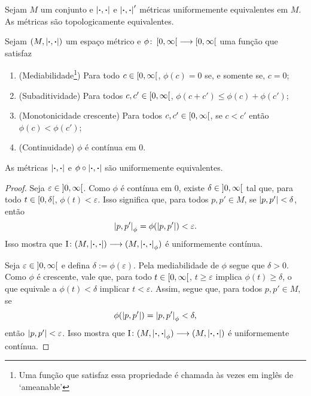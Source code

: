 \begin{proposition}
Sejam $M$ um conjunto e $\left\vert{\bm{\cdot}},{\bm{\cdot}}\right\vert$ e $\left\vert{\bm{\cdot}},{\bm{\cdot}}\right\vert'$ métricas uniformemente equivalentes em $M$. As métricas são topologicamente equivalentes.
\end{proposition}

\begin{proposition}
Sejam $(M, \left\vert{\bm{\cdot}},{\bm{\cdot}}\right\vert)$ um espaço métrico e $\phi\colon \allowbreak \left[0,\allowbreak \infty\right[ \longrightarrow \left[0,\allowbreak \infty\right[$ uma função que satisfaz
	\begin{enumerate}
	\item (Mediabilidade\footnote{Uma função que satisfaz essa propriedade é chamada às vezes em inglês de `ameanable'}) Para todo $c \in \left[0,\allowbreak \infty\right[$, $\phi(c) = 0$ se, e somente se, $c=0$;
	\item (Subaditividade) Para todos $c,c' \in \left[0,\allowbreak \infty\right[$, $\phi(c+c') \leq \phi(c) + \phi(c')$;
	\item (Monotonicidade crescente) Para todos $c,c' \in \left[0,\allowbreak \infty\right[$, se $c < c'$ então $\phi(c) < \phi(c')$;
	\item (Continuidade) $\phi$ é contínua em $0$.
	\end{enumerate}
As métricas $\left\vert{\bm{\cdot}},{\bm{\cdot}}\right\vert$ e $\phi \circ \left\vert{\bm{\cdot}},{\bm{\cdot}}\right\vert$  são uniformemente equivalentes.
\end{proposition}
\begin{proof}
Seja $\varepsilon \in \left]0,\allowbreak \infty\right[$. Como $\phi$ é contínua em $0$, existe $\delta \in \left]0,\allowbreak \infty\right[$ tal que, para todo $t \in \left[0,\allowbreak \delta\right[$, $\phi(t) < \varepsilon$. Isso significa que, para todos $p,p' \in M$, se $\left\vert{p},{p'}\right\vert < \delta$, então
	\[
	\left\vert{p},{p'}\right\vert_\phi = \phi(\left\vert{p},{p'}\right\vert) < \varepsilon.
	\]
Isso mostra que $\mathrm{I}\colon \allowbreak (M,\left\vert{\bm{\cdot}},{\bm{\cdot}}\right\vert) \longrightarrow (M,\left\vert{\bm{\cdot}},{\bm{\cdot}}\right\vert_\phi)$ é uniformemente contínua.

Seja $\varepsilon \in \left]0,\allowbreak \infty\right[$ e defina $\delta := \phi(\varepsilon)$. Pela mediabilidade de $\phi$ segue que $\delta > 0$. Como $\phi$ é crescente, vale que, para todo $t \in \left[0,\allowbreak \infty\right[$, $t \geq \varepsilon$ implica $\phi(t) \geq \delta$, o que equivale a $\phi(t) < \delta$ implicar $t<\varepsilon$. Assim, segue que, para todos $p,p' \in M$, se
	\[
	\phi(\left\vert{p},{p'}\right\vert) = \left\vert{p},{p'}\right\vert_\phi < \delta,
	\]
então $\left\vert{p},{p'}\right\vert < \varepsilon$. Isso mostra que $\mathrm{I}\colon \allowbreak (M,\left\vert{\bm{\cdot}},{\bm{\cdot}}\right\vert_\phi) \longrightarrow (M,\left\vert{\bm{\cdot}},{\bm{\cdot}}\right\vert)$ é uniformemente contínua.
\end{proof}















